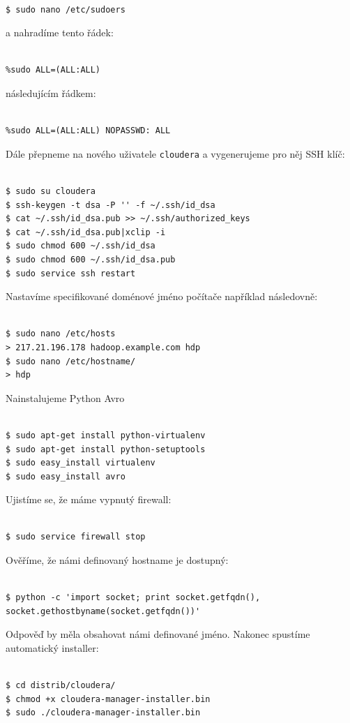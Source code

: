\documentclass[thesis=M,czech]{FITthesis}[2012/06/26]
\begin{document}
\begin{lstlisting}[frame=single]  % Start your code-block

$ sudo nano /etc/sudoers
\end{lstlisting}
a nahradíme tento řádek:
\begin{lstlisting}[frame=single]  % Start your code-block

%sudo ALL=(ALL:ALL)
\end{lstlisting}
následujícím řádkem:
\begin{lstlisting}[frame=single]  % Start your code-block

%sudo ALL=(ALL:ALL) NOPASSWD: ALL
\end{lstlisting}

Dále přepneme na nového uživatele \texttt{cloudera} a  vygenerujeme pro něj SSH klíč:
\begin{lstlisting}[frame=single]  % Start your code-block

$ sudo su cloudera
$ ssh-keygen -t dsa -P '' -f ~/.ssh/id_dsa
$ cat ~/.ssh/id_dsa.pub >> ~/.ssh/authorized_keys
$ cat ~/.ssh/id_dsa.pub|xclip -i
$ sudo chmod 600 ~/.ssh/id_dsa
$ sudo chmod 600 ~/.ssh/id_dsa.pub
$ sudo service ssh restart
\end{lstlisting}

Nastavíme specifikované doménové jméno počítače například následovně:
\begin{lstlisting}[frame=single]  % Start your code-block

$ sudo nano /etc/hosts
> 217.21.196.178 hadoop.example.com hdp
$ sudo nano /etc/hostname/
> hdp
\end{lstlisting}

Nainstalujeme Python Avro
\begin{lstlisting}[frame=single]  % Start your code-block

$ sudo apt-get install python-virtualenv
$ sudo apt-get install python-setuptools
$ sudo easy_install virtualenv
$ sudo easy_install avro
\end{lstlisting}
Ujistíme se, že máme vypnutý firewall:
\begin{lstlisting}[frame=single]  % Start your code-block

$ sudo service firewall stop
\end{lstlisting}
Ověříme, že námi definovaný hostname je dostupný:
\begin{lstlisting}[frame=single]  % Start your code-block

$ python -c 'import socket; print socket.getfqdn(), socket.gethostbyname(socket.getfqdn())'
\end{lstlisting}
Odpověď by měla obsahovat námi definované jméno.
Nakonec spustíme automatický installer:
\begin{lstlisting}[frame=single]  % Start your code-block

$ cd distrib/cloudera/
$ chmod +x cloudera-manager-installer.bin
$ sudo ./cloudera-manager-installer.bin
\end{lstlisting}
\end{document}
